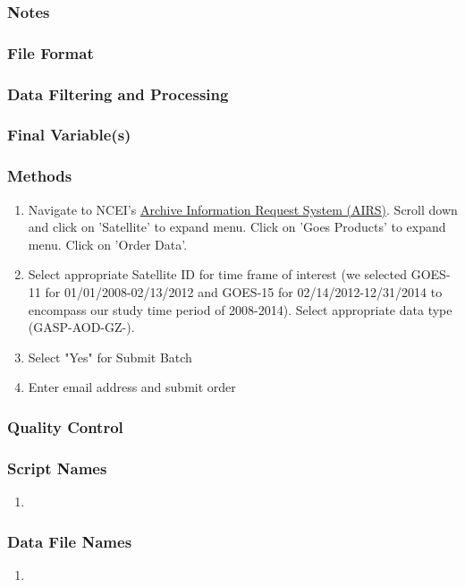 \subsubsection*{Notes}

\subsubsection*{File Format}

\subsubsection*{Data Filtering and Processing}

\subsubsection*{Final Variable(s)}

\subsubsection*{Methods}

\begin{enumerate}
\item Navigate to NCEI's \href{https://www.ncdc.noaa.gov/has/has.dsselect}{Archive Information Request System (AIRS)}. Scroll down and click on 'Satellite' to expand menu. Click on 'Goes Products' to expand menu. Click on 'Order Data'.
\item Select appropriate Satellite ID for time frame of interest (we selected GOES-11 for 01/01/2008-02/13/2012 and GOES-15 for 02/14/2012-12/31/2014 to encompass our study time period of 2008-2014). Select appropriate data type (GASP-AOD-GZ-).
\item Select "Yes" for Submit Batch
\item Enter email address and submit order
\end{enumerate}

\subsubsection*{Quality Control}

\subsubsection*{Script Names}

\begin{enumerate}
\item 
\end{enumerate}

\subsubsection*{Data File Names}

\begin{enumerate}
\item 
\end{enumerate}
